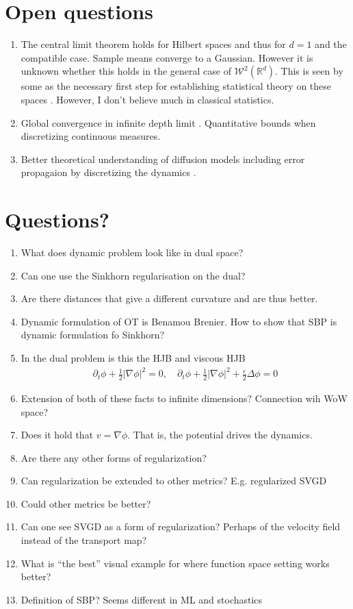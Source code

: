 \documentclass[
    a4paper,
    DIV=14,
    abstract=true,
    numbers=noenddot
]
{scrartcl}
\theoremstyle{definition}
\newcommand{\R}{\mathbb{R}}
\newcommand{\Ww}{\mathcal{W}}
\begin{document}
\section{Open questions}
\begin{enumerate}
    \item The central limit theorem holds for Hilbert spaces and thus for $d=1$ and the compatible case. Sample means converge to a Gaussian. However  it is unknown whether this holds in the general case of $\Ww ^2(\R^d)$. This is seen by some as the necessary first step for establishing statistical theory on these spaces \cite[Section 4.6]{panaretos2019statistical}. However, I don't believe much in classical statistics.  
    \item Global convergence in infinite depth limit \cite[Section 6.1]{peyre2025optimal}. Quantitative bounds when discretizing continuous measures.
    \item Better theoretical understanding of diffusion models including error propagaion by discretizing the dynamics \cite[Section 3.2]{peyre2025optimal}.
\end{enumerate}


\section{Questions?}
\begin{enumerate}
    \item What does dynamic problem look like in dual space?
    \item Can one use the Sinkhorn regularisation on the dual?
    \item Are there distances that give a different curvature and are thus better.
    \item Dynamic formulation of OT is Benamou Brenier. How to show that SBP is dynamic formulation fo Sinkhorn?
    \item In the dual problem is this the HJB and viscous HJB 
    \begin{align*}
        \partial_t \phi+\frac{1}{2}|\nabla \phi|^2=0, \quad \partial_t \phi+\frac{1}{2}|\nabla \phi|^2+\frac{\epsilon}{2} \Delta \phi=0
    \end{align*}
    
    \item Extension of both of these facts to infinite dimensions? Connection wih WoW space?
    \item Does it hold that $v= \nabla \phi $. That is, the potential drives the dynamics. 
    \item Are there any other forms of regularization?
    \item Can regularization be extended to other metrics? E.g. regularized SVGD
    \item Could other metrics be better?
    \item Can one see SVGD as a form of regularization? Perhaps of the velocity field instead of the transport map?
    \item What is ``the best'' visual example for where function space setting works better?
    \item Definition of SBP? Seems different in ML and stochastics
\end{enumerate}



\end{document}
